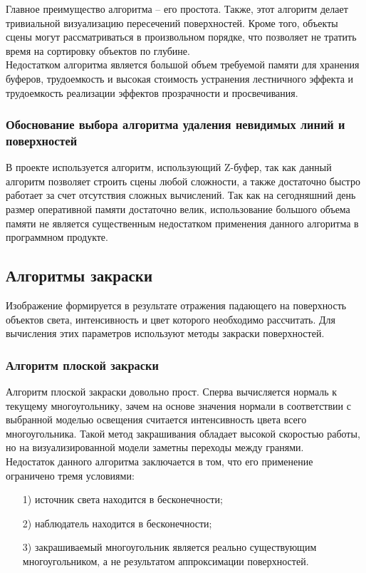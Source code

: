 \documentclass[54pt, a4paper]{article}
\begin{document}
	Главное преимущество алгоритма – его простота. Также, этот алгоритм делает тривиальной визуализацию пересечений поверхностей. Кроме того, объекты сцены могут рассматриваться в произвольном порядке, что позволяет не тратить время на сортировку объектов по глубине.\\
	
	Недостатком алгоритма является большой объем требуемой памяти для хранения буферов, трудоемкость и высокая стоимость устранения лестничного эффекта и трудоемкость реализации эффектов прозрачности и просвечивания.\\
	\subsubsection{Обоснование выбора алгоритма удаления невидимых линий и поверхностей}
	В проекте используется алгоритм, использующий Z-буфер, так как данный алгоритм позволяет строить сцены любой сложности, а также достаточно быстро работает за счет отсутствия сложных вычислений. Так как на сегодняшний день размер оперативной памяти достаточно велик, использование большого объема памяти не является существенным недостатком применения данного алгоритма в программном продукте.
	\subsection{Алгоритмы закраски}
	Изображение формируется в результате отражения падающего на поверхность объектов света, интенсивность и цвет которого необходимо рассчитать. Для
	вычисления этих параметров используют методы закраски поверхностей.

	\subsubsection{Алгоритм плоской закраски}
	Алгоритм плоской закраски довольно прост. Сперва вычисляется нормаль к текущему многоугольнику, зачем на основе значения нормали в соответствии с выбранной моделью освещения считается интенсивность цвета всего многоугольника. Такой метод закрашивания обладает высокой скоростью работы, но на визуализированной модели заметны переходы между гранями.\\
	Недостаток данного алгоритма заключается в том, что его применение ограничено тремя условиями:
	\begin{enumerate}
		\item[1)]источник света находится в бесконечности;
		\item[2)]наблюдатель находится в бесконечности; 
		\item[3)]закрашиваемый многоугольник является реально существующим многоугольником, а не результатом аппроксимации поверхностей.
	\end{enumerate}
\end{document}

